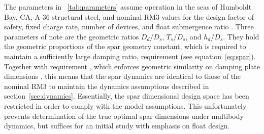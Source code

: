 The parameters in \tablename~\ref{tab:parameters} assume operation in the seas of Humboldt Bay, CA, A-36 structural steel, and nominal RM3 values for the design factor of safety, fixed charge rate, number of devices, and float submergence ratio \cite{RM3}.
Three parameters of note are the geometric ratios $D_d/D_s$, $T_s/D_s$, and $h_d/D_s$.
They hold the geometric proportions of the spar geometry constant, which is required to maintain a sufficiently large damping ratio, requirement  (see equation~\eqref{eq:spar}).
Together with requirement , which enforces geometric similarity on damping plate dimensions%
, this means that the spar dynamics are identical to those of the nominal RM3 to maintain the dynamics assumptions described in section~\ref{sec:dynamics}.
Essentially, the spar dimensional design space has been restricted in order to comply with the model assumptions.
This unfortunately prevents determination of the true optimal spar dimensions under multibody dynamics, but suffices for an initial study with emphasis on float design.

